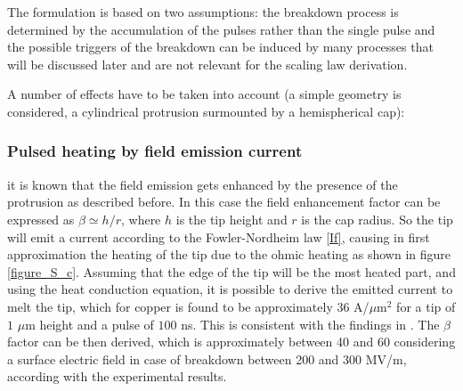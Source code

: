 The formulation is based on two assumptions: the breakdown process is determined by the accumulation of the pulses rather than the single pulse and the possible triggers of the breakdown can be induced by many processes that will be discussed later and are not relevant for the scaling law derivation.

A number of effects have to be taken into account (a simple geometry is considered, a cylindrical protrusion surmounted by a hemispherical  cap): 

\subsubsection{Pulsed heating by field emission current}

it is known that the field emission gets enhanced by the presence of the protrusion as described before. In this case the field enhancement factor can be expressed as $\beta \simeq h/r$, where $h$ is the tip height and $r$ is the cap radius. So the tip will emit a current according to the Fowler-Nordheim law \ref{If}, causing in first approximation the heating of the tip due to the ohmic heating as shown in figure \ref{figure_S_c}. Assuming that the edge of the tip will be the most heated part, and using the heat conduction equation, it is possible to derive the emitted current to melt the tip, which for copper is found to be approximately $36$ A/$\mu$m$^2$ for a tip of $1$  $\mu$m height and a pulse of $100$ ns. This is consistent with the findings in \cite{soviet:1983}. The $\beta$ factor can be then derived, which is approximately between 40 and 60 considering a surface electric field in case of breakdown between 200 and $300$ MV/m, according with the experimental results.

